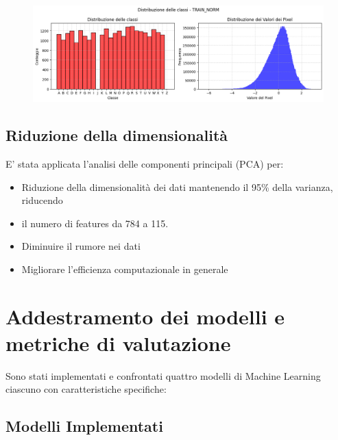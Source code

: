 \documentclass{article}
\begin{document}
\begin{figure}[H]
    \centering
    \includegraphics[scale=0.5]{Figures/output8.png}\label{fig:dataset_preprocessing}
\end{figure}

\subsection{Riduzione della dimensionalità}
E' stata applicata l'analisi delle componenti principali (PCA) per:
\begin{itemize}
    \item Riduzione della dimensionalità dei dati mantenendo il 95\% della varianza, riducendo 
    \item il numero di features da 784 a 115. 
    \item Diminuire il rumore nei dati
    \item Migliorare l'efficienza computazionale in generale
\end{itemize}

\clearpage

\section{Addestramento dei modelli e metriche di valutazione}

Sono stati implementati e confrontati quattro modelli di Machine Learning ciascuno 
con caratteristiche specifiche: 

\subsection{Modelli Implementati}
\end{document}
